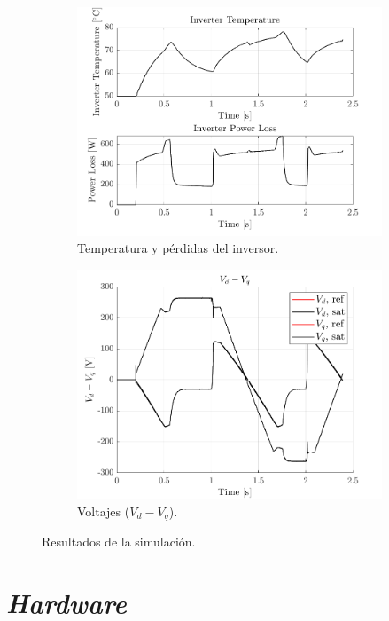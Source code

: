 \begin{figure}[H]
    \begin{subfigure}{0.4\textwidth}
        \includegraphics[width=\linewidth]{fig/PLECS_thermal.png}
        \caption{Temperatura y pérdidas del inversor.}
    \end{subfigure}
    \begin{subfigure}{0.4\textwidth}
        \includegraphics[width=\linewidth]{fig/PLECS_vdvq.png}
        \caption{Voltajes ($V_{d} - V_{q}$).}
    \end{subfigure}

    \caption{Resultados de la simulación.}
\end{figure}



\section{\textit{Hardware}}

